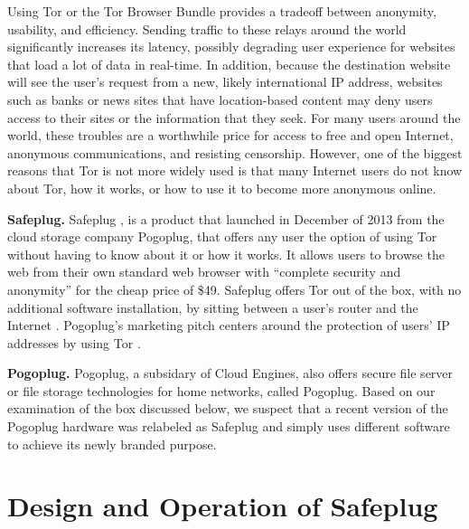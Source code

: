 \documentclass[conference]{IEEEtran}
\begin{document}
Using Tor or the Tor Browser Bundle provides a tradeoff between anonymity, usability, and efficiency.  Sending traffic to these relays around the world significantly increases its latency, possibly degrading user experience for websites that load a lot of data in real-time.  In addition, because the destination website will see the user's request from a new, likely international IP address, websites such as banks or news sites that have location-based content may deny users access to their sites or the information that they seek.  For many users around the world, these troubles are a worthwhile price for access to free and open Internet, anonymous communications, and resisting censorship.  However, one of the biggest reasons that Tor is not more widely used is that many Internet users do not know about Tor, how it works, or how to use it to become more anonymous online.

{\bf Safeplug.} Safeplug \cite{safeplug}, is a product that launched in December of 2013 from the cloud storage company Pogoplug, that offers any user the option of using Tor without having to know about it or how it works.  It allows users to browse the web from their own standard web browser with “complete security and anonymity” for the cheap price of \$49.  Safeplug offers Tor out of the box, with no additional software installation, by sitting between a user's router and the Internet \cite{wired}.  Pogoplug's marketing pitch centers around the protection of users' IP addresses by using Tor \cite{bittech}.

{\bf Pogoplug.} Pogoplug, a subsidary of Cloud Engines, also offers secure file server or file storage technologies for home networks, called Pogoplug.  Based on our examination of the box discussed below, we suspect that a recent version of the Pogoplug hardware was relabeled as Safeplug and simply uses different software to achieve its newly branded purpose.

\section{Design and Operation of Safeplug}
\end{document}
